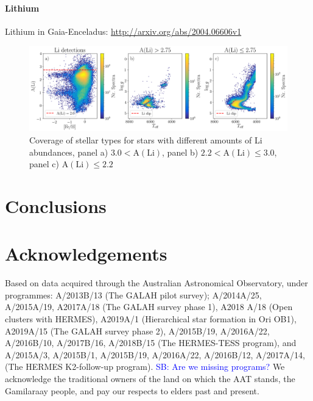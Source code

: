 \documentclass[fleqn,usenatbib,useAMS]{mnras}
\newcommand\SB[1]{\textcolor{blue}{SB: #1}}
\begin{document}
\paragraph*{Lithium}

\citet{Cescutti2020} Lithium in Gaia-Enceladus: \url{http://arxiv.org/abs/2004.06606v1}

\begin{figure}
\centering
\includegraphics[width=\textwidth]{figures/DR3_Li_overview.png}
  \caption{Coverage of stellar types for stars with different amounts of Li abundances, panel a) $3.0 < \mathrm{A(Li)}$, panel b) $2.2 < \mathrm{A(Li)} \leq 3.0$, panel c) $\mathrm{A(Li)} \leq 2.2$}
  \label{fig:DR3_Li_overview}
\end{figure}



\section{Conclusions} \label{sec:conclusions}


\section*{Acknowledgements}

Based on data acquired through the Australian Astronomical Observatory, under programmes: A/2013B/13 (The GALAH pilot survey); A/2014A/25, A/2015A/19, A2017A/18 (The GALAH survey phase 1), A2018 A/18 (Open clusters with HERMES), A2019A/1 (Hierarchical star formation in Ori OB1),  A2019A/15 (The GALAH survey phase 2), A/2015B/19, A/2016A/22, A/2016B/10, A/2017B/16, A/2018B/15 (The HERMES-TESS program), and A/2015A/3, A/2015B/1, A/2015B/19, A/2016A/22, A/2016B/12, A/2017A/14, (The HERMES K2-follow-up program). \SB{Are we missing programs?} We acknowledge the traditional owners of the land on which the AAT stands, the Gamilaraay people, and pay our respects to elders past and present.
\end{document}
